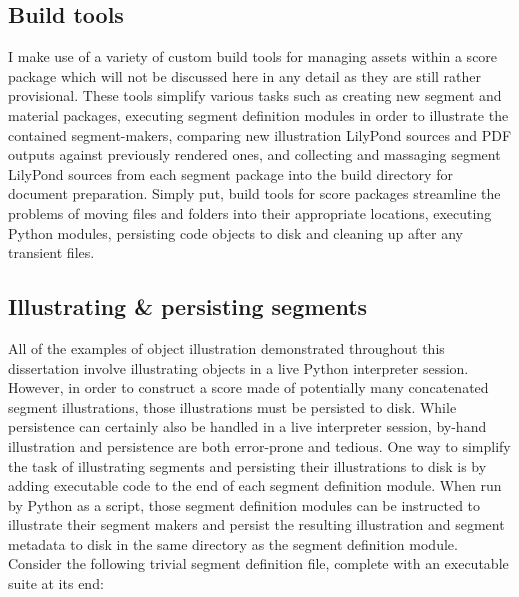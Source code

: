 \subsection{Build tools}
\label{ssec:build-tools}

I make use of a variety of custom build tools for managing assets within a
score package which will not be discussed here in any detail as they are still
rather provisional. These tools simplify various tasks such as creating new
segment and material packages, executing segment definition modules in order to
illustrate the contained segment-makers, comparing new illustration LilyPond
sources and PDF outputs against previously rendered ones, and collecting and
massaging segment LilyPond sources from each segment package into the build
directory for document preparation. Simply put, build tools for score packages
streamline the problems of moving files and folders into their appropriate
locations, executing Python modules, persisting code objects to disk and
cleaning up after any transient files.

\subsection{Illustrating \& persisting segments}
\label{ssec:illustrating-and-persisting-segments}

All of the examples of object illustration demonstrated throughout this
dissertation involve illustrating objects in a live Python interpreter session.
However, in order to construct a score made of potentially many concatenated
segment illustrations, those illustrations must be persisted to disk. While
persistence can certainly also be handled in a live interpreter session,
by-hand illustration and persistence are both error-prone and tedious. One way
to simplify the task of illustrating segments and persisting their
illustrations to disk is by adding executable code to the end of each segment
definition module. When run by Python as a script, those segment definition
modules can be instructed to illustrate  their segment makers and persist the
resulting illustration and segment metadata to disk in the same directory as
the segment definition module. Consider the following trivial segment
definition file, complete with an executable suite at its end:

